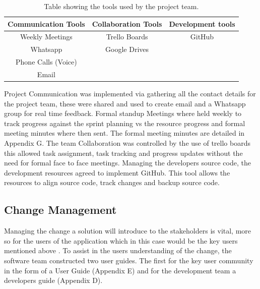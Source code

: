 \documentclass[12pt]{witseiepaper}
\begin{document}
\begin{table}[htb] \caption{Table showing the tools used by the project team.} \label{tbl:Tools} 
	\begin{center}
		\begin{tabular}
			{|c|c|c|} %
			\hline Communication Tools & Collaboration Tools & Development tools \\
			\hline Weekly Meetings &  Trello Boards & GitHub\\
			\hline Whatsapp & Google Drives &\\
			\hline Phone Calls (Voice) &&\\
			\hline Email &&\\
			\hline 
		\end{tabular}
	\end{center}
\end{table}

Project Communication was implemented via gathering all the contact details for the project team, these were shared and used to create email and a Whatsapp group for real time feedback. Formal standup Meetings where held weekly to track progress against the sprint planning vs the resource progress and formal meeting minutes where then sent. The formal meeting minutes are detailed in Appendix G. The team Collaboration was controlled by the use of trello boards \cite{Trello} this allowed task assignment, task tracking and progress updates without the need for formal face to face meetings. Managing the developers source code, the development resources agreed to implement GitHub.\cite{GitHubRef} This tool allows the resources to align source code, track changes and backup source code. 

\subsection{Change Management}

Managing the change a solution will introduce to the stakeholders is vital, more so for the users of the application which in this case would be the key users mentioned above \cite{Change}. To assist in the users understanding of the change, the software team constructed two user guides. The first for the key user community in the form of a User Guide (Appendix E) and for the development team a developers guide (Appendix D).
\end{document}
